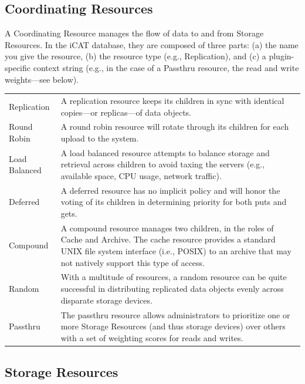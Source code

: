 \documentclass[10pt,oneside]{memoir}
\begin{document}
\subsection{Coordinating Resources}
\label{sec:coordinating_resources}

A Coordinating Resource manages the flow of data to and from Storage Resources. In the iCAT database, they are composed of three parts: (a) the name you give the resource, (b) the resource type (e.g., Replication), and (c) a plugin-specific context string (e.g., in the case of a Passthru resource, the read and write weights---see below).

\begin{center}
\def\arraystretch{1.5}%
\begin{tabular}{ |l|p{10cm}| }
\hline
Replication & A replication resource keeps its children in sync with identical copies---or replicas---of data objects. \\
Round Robin & A round robin resource will rotate through its children for each upload to the system. \\
Load Balanced & A load balanced resource attempts to balance storage and retrieval across children to avoid taxing the servers (e.g., available space, CPU usage, network traffic). \\
Deferred & A deferred resource has no implicit policy and will honor the voting of its children in determining priority for both puts and gets. \\
Compound & A compound resource manages two children, in the roles of Cache and Archive. The cache resource provides a standard UNIX file system interface (i.e., POSIX) to an archive that may not natively support this type of access. \\
Random & With a multitude of resources, a random resource can be quite successful in distributing replicated data objects evenly across disparate storage devices. \\
Passthru & The passthru resource allows administrators to prioritize one or more Storage Resources (and thus storage devices) over others with a set of weighting scores for reads and writes. \\
\hline
\end{tabular}
\end{center}

\subsection{Storage Resources}
\end{document}
